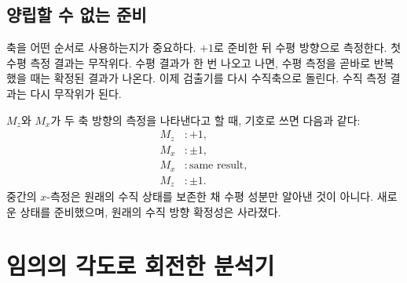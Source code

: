 \subsection{양립할 수 없는 준비}

축을 어떤 순서로 사용하는지가 중요하다. \(+1\)로 준비한 뒤 수평 방향으로 측정한다. 첫 수평 측정 결과는 무작위다. 수평 결과가 한 번 나오고 나면, 수평 측정을 곧바로 반복했을 때는 확정된 결과가 나온다. 이제 검출기를 다시 수직축으로 돌린다. 수직 측정 결과는 다시 무작위가 된다.

\(M_z\)와 \(M_x\)가 두 축 방향의 측정을 나타낸다고 할 때, 기호로 쓰면 다음과 같다:
\begin{equation}
\begin{aligned}
  M_z&:+1,\\
  M_x&:\pm1,\\
  M_x&:\text{same result},\\
  M_z&:\pm1.
\end{aligned}
\end{equation}
중간의 \(x\)-측정은 원래의 수직 상태를 보존한 채 수평 성분만 알아낸 것이 아니다. 새로운 상태를 준비했으며, 원래의 수직 방향 확정성은 사라졌다.

\begin{classroomqa}
\end{classroomqa}

\begin{classroomqa}
\end{classroomqa}

\section{임의의 각도로 회전한 분석기}

